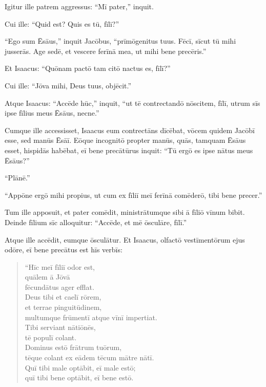 \Versus Igitur ille patrem aggressus: ``Mī pater,'' inquit.

Cui ille: ``Quid est? Quis es tū, fīlī?''

\Versus ``Ego sum Ēsāus,'' inquit Jacōbus, ``prīmōgenitus tuus. Fēcī, sīcut tū mihi jusserās. Age sedē, et vescere ferīnā mea, ut mihi bene precēris.''

\Versus Et Isaacus: ``Quōnam pactō tam citō nactus es, fīlī?''

Cui ille: ``Jōva mihi, Deus tuus, objēcit.''

\Versus Atque Isaacus: ``Accēde hūc,'' inquit, ``ut tē contrectandō nōscitem, fīlī, utrum sīs ipse fīlius meus Ēsāus, necne.''

\Versus Cumque ille accessisset, Isaacus eum contrectāns dīcēbat, vōcem quidem Jacōbī esse, sed manūs Ēsāī.
\Versus Eōque incognitō propter manūs, quās, tamquam Ēsāus esset, hispidās habēbat, eī bene precātūrus inquit:
\Versus ``Tū ergō es ipse nātus meus Ēsāus?''

``Plānē.''

\Versus ``Appōne ergō mihi propius, ut cum ex fīliī meī ferīnā comēderō, tibi bene precer.''

Tum ille apposuit, et pater comēdit, ministrātumque sibi ā fīliō vīnum bibit.
\Versus Deinde fīlium sīc alloquitur: ``Accēde, et mē ōsculāre, fīlī.''

\Versus Atque ille accēdit, eumque ōsculātur. Et Isaacus, olfactō vestīmentōrum ejus odōre, eī bene precātus est hīs verbīs:

\begin{verse}
\begin{patverse*}
``Hīc meī fīliī odor est,\\
 quālem ā Jōvā\\
 fēcundātus ager efflat.\\
\Versus Deus tibi et caelī rōrem,\\
 et terrae pinguitūdinem,\\
 multumque frūmentī atque vīnī impertiat.\\
\Versus Tibi serviant nātiōnēs,\\
 tē populī colant.\\
 Dominus estō frātrum tuōrum,\\
 tēque colant ex eādem tēcum mātre nātī.\\
 Quī tibi male optābit, eī male estō;\\
 quī tibi bene optābit, eī bene estō.
\end{patverse*}
\end{verse}

